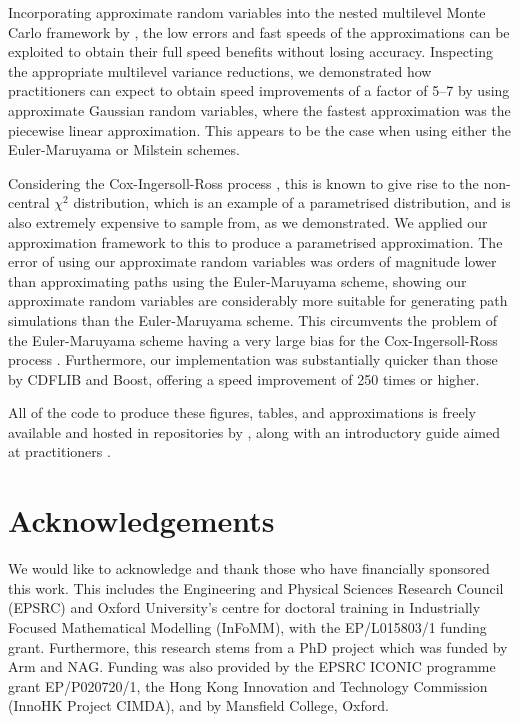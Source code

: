 \documentclass[9pt,a4paper,english]{extarticle}
\begin{document}
Incorporating approximate random variables into the nested multilevel Monte Carlo framework by \citet{giles2020approximate}, the low errors and fast speeds of the approximations can be exploited to obtain their full speed benefits without losing accuracy. Inspecting the appropriate multilevel variance reductions, we demonstrated how practitioners can expect to obtain speed improvements of a factor of 5--7 by using approximate Gaussian random variables, where the fastest approximation was the piecewise linear approximation. This appears to be the case when using either the Euler-Maruyama or Milstein schemes. 

Considering the Cox-Ingersoll-Ross process \citep{cox1985theory}, this is known to give rise to the non-central $ \chi^2 $ distribution, which is an example of a parametrised distribution, and is also extremely expensive to sample from, as we demonstrated. We applied our approximation framework to this to produce a parametrised approximation. The error of using our approximate random variables was orders of magnitude lower than approximating paths using the Euler-Maruyama scheme, showing our approximate random variables are considerably more suitable for generating path simulations than the Euler-Maruyama scheme. This circumvents the problem of the Euler-Maruyama scheme having a very large bias for the Cox-Ingersoll-Ross process \citep{broadie2006exact}. Furthermore, our implementation was substantially quicker than those by CDFLIB and Boost, offering a speed improvement of 250 times or higher. 

All of the code to produce these figures, tables, and approximations is freely available and hosted in repositories by \citet{sheridan2020approximate_inverse,sheridan2020approximate_random}, along with an introductory guide aimed at practitioners \citep{sheridan2020approximate_random}.

\section{Acknowledgements}

We would like to acknowledge and thank those who have financially sponsored this work. This includes the Engineering and Physical Sciences Research Council (EPSRC) and Oxford University's centre for doctoral training in Industrially Focused Mathematical Modelling (InFoMM), with the EP/L015803/1 funding grant. Furthermore, this research stems from a PhD project \citep{sheridan2020nested} which was funded by Arm and NAG. Funding was also provided by the EPSRC ICONIC programme grant EP/P020720/1, the Hong Kong Innovation and Technology Commission (InnoHK Project CIMDA), and by Mansfield College, Oxford.  


\end{document}
